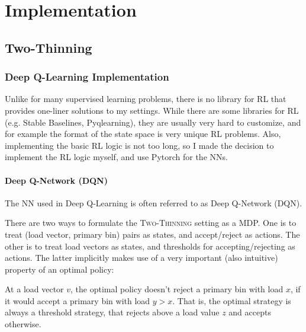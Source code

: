 \chapter{Implementation}\label{implementation}

\ifpdf
    \graphicspath{{Chapter3/Figs/Raster/}{Chapter3/Figs/PDF/}{Chapter3/Figs/}}
\else
    \graphicspath{{Chapter3/Figs/Vector/}{Chapter3/Figs/}}
\fi


\section{Two-Thinning}


\subsection{Deep Q-Learning Implementation}


Unlike for many supervised learning problems, there is no library for RL that provides one-liner solutions to my settings. While there are some libraries for RL (e.g. Stable Baselines, Pyqlearning), they are usually very hard to customize, and for example the format of the state space is very unique RL problems. Also, implementing the basic RL logic is not too long, so I made the decision to implement the RL logic myself, and use Pytorch for the NNs.




\subsubsection{Deep Q-Network (DQN)} \label{DQN}


The NN used in Deep Q-Learning is often referred to as Deep Q-Network (DQN). 


There are two ways to formulate the \textsc{Two-Thinning} setting as a MDP. One is to treat (load vector, primary bin) pairs as states, and accept/reject as actions. The other is to treat load vectors as states, and thresholds for accepting/rejecting as actions. The latter implicitly makes use of a very important (also intuitive) property of an optimal policy:


\begin{lemma} \label{lemma: thresholdproperty}
At a load vector $v$, the optimal policy doesn't reject a primary bin with load $x$, if it would accept a primary bin with load $y>x$. That is, the optimal strategy is always a threshold strategy, that rejects above a load value $z$ and accepts otherwise.
\end{lemma}


